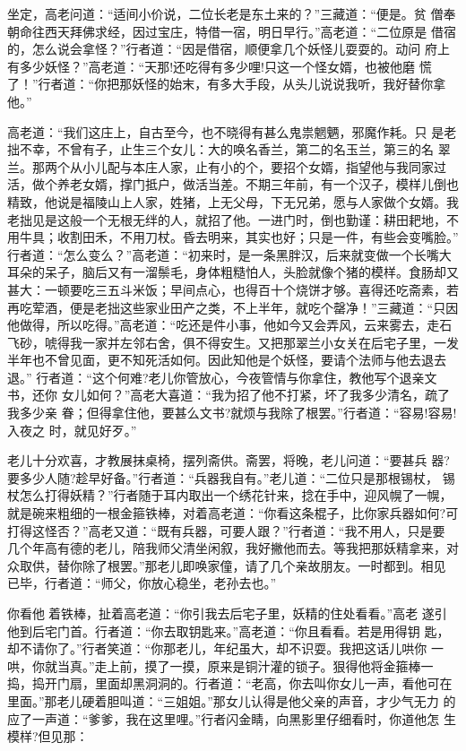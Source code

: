 坐定，高老问道：“适间小价说，二位长老是东土来的？”三藏道：“便是。贫
僧奉朝命往西天拜佛求经，因过宝庄，特借一宿，明日早行。”高老道：“二位原是
借宿的，怎么说会拿怪？”行者道：“因是借宿，顺便拿几个妖怪儿耍耍的。动问
府上有多少妖怪？”高老道：“天那!还吃得有多少哩!只这一个怪女婿，也被他磨
慌了！”行者道：“你把那妖怪的始末，有多大手段，从头儿说说我听，我好替你拿
他。”

高老道：“我们这庄上，自古至今，也不晓得有甚么鬼祟魍魉，邪魔作耗。只
是老拙不幸，不曾有子，止生三个女儿：大的唤名香兰，第二的名玉兰，第三的名
翠兰。那两个从小儿配与本庄人家，止有小的个，要招个女婿，指望他与我同家过
活，做个养老女婿，撑门抵户，做活当差。不期三年前，有一个汉子，模样儿倒也
精致，他说是福陵山上人家，姓猪，上无父母，下无兄弟，愿与人家做个女婿。我
老拙见是这般一个无根无绊的人，就招了他。一进门时，倒也勤谨：耕田耙地，不
用牛具；收割田禾，不用刀杖。昏去明来，其实也好；只是一件，有些会变嘴脸。”
行者道：“怎么变么？”高老道：“初来时，是一条黑胖汉，后来就变做一个长嘴大
耳朵的呆子，脑后又有一溜鬃毛，身体粗糙怕人，头脸就像个猪的模样。食肠却又
甚大：一顿要吃三五斗米饭；早间点心，也得百十个烧饼才够。喜得还吃斋素，若
再吃荤酒，便是老拙这些家业田产之类，不上半年，就吃个罄净！”三藏道：“只因
他做得，所以吃得。”高老道：“吃还是件小事，他如今又会弄风，云来雾去，走石
飞砂，唬得我一家并左邻右舍，俱不得安生。又把那翠兰小女关在后宅子里，一发
半年也不曾见面，更不知死活如何。因此知他是个妖怪，要请个法师与他去退去退。”
行者道：“这个何难?老儿你管放心，今夜管情与你拿住，教他写个退亲文书，还你
女儿如何？”高老大喜道：“我为招了他不打紧，坏了我多少清名，疏了我多少亲
眷；但得拿住他，要甚么文书?就烦与我除了根罢。”行者道：“容易!容易!入夜之
时，就见好歹。”

老儿十分欢喜，才教展抹桌椅，摆列斋供。斋罢，将晚，老儿问道：“要甚兵
器?要多少人随?趁早好备。”行者道：“兵器我自有。”老儿道：“二位只是那根锡杖，
锡杖怎么打得妖精？”行者随于耳内取出一个绣花针来，捻在手中，迎风幌了一幌，
就是碗来粗细的一根金箍铁棒，对着高老道：“你看这条棍子，比你家兵器如何?可
打得这怪否？”高老又道：“既有兵器，可要人跟？”行者道：“我不用人，只是要
几个年高有德的老儿，陪我师父清坐闲叙，我好撇他而去。等我把那妖精拿来，对
众取供，替你除了根罢。”那老儿即唤家僮，请了几个亲故朋友。一时都到。相见
已毕，行者道：“师父，你放心稳坐，老孙去也。”

你看他着铁棒，扯着高老道：“你引我去后宅子里，妖精的住处看看。”高老
遂引他到后宅门首。行者道：“你去取钥匙来。”高老道：“你且看看。若是用得钥
匙，却不请你了。”行者笑道：“你那老儿，年纪虽大，却不识耍。我把这话儿哄你
一哄，你就当真。”走上前，摸了一摸，原来是铜汁灌的锁子。狠得他将金箍棒一
捣，捣开门扇，里面却黑洞洞的。行者道：“老高，你去叫你女儿一声，看他可在
里面。”那老儿硬着胆叫道：“三姐姐。”那女儿认得是他父亲的声音，才少气无力
的应了一声道：“爹爹，我在这里哩。”行者闪金睛，向黑影里仔细看时，你道他怎
生模样?但见那：

